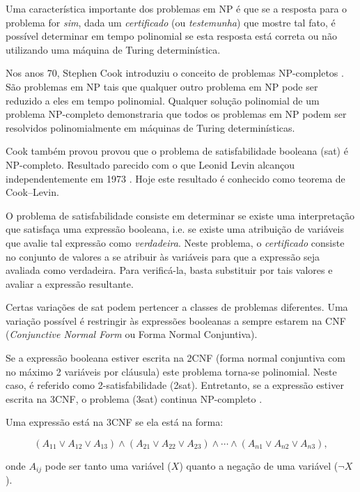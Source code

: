 \documentclass[a4paper,12pt,oneside,onecolumn]{uerj}
\begin{document}
Uma característica importante dos problemas em NP é que se a resposta para o problema for \emph{sim}, dada um \emph{certificado} (ou \emph{testemunha}) que mostre tal fato, é possível determinar em tempo polinomial se esta resposta está correta ou não utilizando uma máquina de Turing determinística.

Nos anos 70, Stephen Cook introduziu o conceito de problemas NP-completos \cite{bib:Cook71}. São problemas em NP tais que qualquer outro problema em NP pode ser reduzido a eles em tempo polinomial. Qualquer solução polinomial de um problema NP-completo demonstraria que todos os problemas em NP podem ser resolvidos polinomialmente em máquinas de Turing determinísticas.

Cook também provou provou que o problema de satisfabilidade booleana ({\sc sat}) é NP-completo. Resultado parecido com o que Leonid Levin alcançou independentemente em 1973 \cite{bib:Levin73}. Hoje este resultado é conhecido como teorema de Cook--Levin. 

O problema de satisfabilidade consiste em determinar se existe uma interpretação que satisfaça uma expressão booleana, i.e. se existe uma atribuição de variáveis que avalie tal expressão como \emph{verdadeira}. Neste problema, o \emph{certificado} consiste no conjunto de valores a se atribuir às variáveis para que a expressão seja avaliada como verdadeira. Para verificá-la, basta substituir por tais valores e avaliar a expressão resultante.

Certas variações de {\sc sat} podem pertencer a classes de problemas diferentes. Uma variação possível é restringir às expressões booleanas a sempre estarem na CNF (\emph{Conjunctive Normal Form} ou Forma Normal Conjuntiva). 

Se a expressão booleana estiver escrita na 2CNF (forma normal conjuntiva com no máximo 2 variáveis por cláusula) este problema torna-se polinomial. Neste caso, é referido como 2-satisfabilidade ({\sc 2sat}). Entretanto, se a expressão estiver escrita na 3CNF, o problema ({\sc 3sat}) continua NP-completo \cite{bib:Karp72}.

Uma expressão está na 3CNF se ela está na forma:

\begin{equation*}
(A_{11} \lor A_{12} \lor A_{13}) \wedge (A_{21} \lor A_{22} \lor A_{23}) \wedge \cdots \wedge (A_{n1} \lor A_{n2} \lor A_{n3}),
\end{equation*}


onde $A_{ij}$ pode ser tanto uma variável ($X$) quanto a negação de uma variável ($\neg X$).
\end{document}
